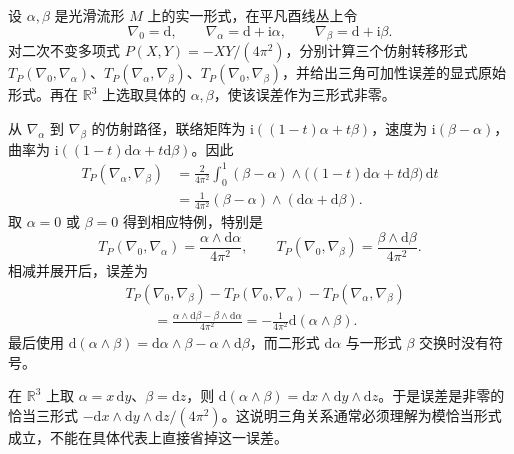\begin{exercise}\label{g2:ex:abelian-transgression-triangle}
	设 \(\alpha,\beta\) 是光滑流形 \(M\) 上的实一形式，在平凡酉线丛上令
	\[
		\nabla_0=\mathrm d,\qquad \nabla_\alpha=\mathrm d+\mathrm i\alpha,
		\qquad \nabla_\beta=\mathrm d+\mathrm i\beta.
	\]
	对二次不变多项式 \(P(X,Y)=-XY/(4\pi^2)\)，分别计算三个仿射转移形式 \(T_P(\nabla_0,\nabla_\alpha)\)、\(T_P(\nabla_\alpha,\nabla_\beta)\)、\(T_P(\nabla_0,\nabla_\beta)\)，并给出三角可加性误差的显式原始形式。再在 \(\mathbb R^3\) 上选取具体的 \(\alpha,\beta\)，使该误差作为三形式非零。
\end{exercise}
\begin{solution}
	从 \(\nabla_\alpha\) 到 \(\nabla_\beta\) 的仿射路径，联络矩阵为 \(\mathrm i((1-t)\alpha+t\beta)\)，速度为 \(\mathrm i(\beta-\alpha)\)，曲率为 \(\mathrm i((1-t)\mathrm d\alpha+t\mathrm d\beta)\)。因此
	\[
	\begin{aligned}
		T_P(\nabla_\alpha,\nabla_\beta)
		&=\frac{2}{4\pi^2}\int_0^1
		(\beta-\alpha)\wedge\bigl((1-t)\mathrm d\alpha+t\mathrm d\beta\bigr)\,\mathrm dt\\
		&=\frac1{4\pi^2}(\beta-\alpha)\wedge(\mathrm d\alpha+\mathrm d\beta).
	\end{aligned}
	\]
	取 \(\alpha=0\) 或 \(\beta=0\) 得到相应特例，特别是
	\[
		T_P(\nabla_0,\nabla_\alpha)=\frac{\alpha\wedge\mathrm d\alpha}{4\pi^2},
		\qquad
		T_P(\nabla_0,\nabla_\beta)=\frac{\beta\wedge\mathrm d\beta}{4\pi^2}.
	\]
	相减并展开后，误差为
	\[
	\begin{aligned}
		&T_P(\nabla_0,\nabla_\beta)
		-T_P(\nabla_0,\nabla_\alpha)-T_P(\nabla_\alpha,\nabla_\beta)\\
		&\qquad=\frac{\alpha\wedge\mathrm d\beta-\beta\wedge\mathrm d\alpha}{4\pi^2}
		=-\frac1{4\pi^2}\mathrm d(\alpha\wedge\beta).
	\end{aligned}
	\]
	最后使用 \(\mathrm d(\alpha\wedge\beta)=\mathrm d\alpha\wedge\beta-\alpha\wedge\mathrm d\beta\)，而二形式 \(\mathrm d\alpha\) 与一形式 \(\beta\) 交换时没有符号。

	在 \(\mathbb R^3\) 上取 \(\alpha=x\,\mathrm dy\)、\(\beta=\mathrm dz\)，则 \(\mathrm d(\alpha\wedge\beta)=\mathrm dx\wedge\mathrm dy\wedge\mathrm dz\)。于是误差是非零的恰当三形式 \(-\mathrm dx\wedge\mathrm dy\wedge\mathrm dz/(4\pi^2)\)。这说明三角关系通常必须理解为模恰当形式成立，不能在具体代表上直接省掉这一误差。
\end{solution}

